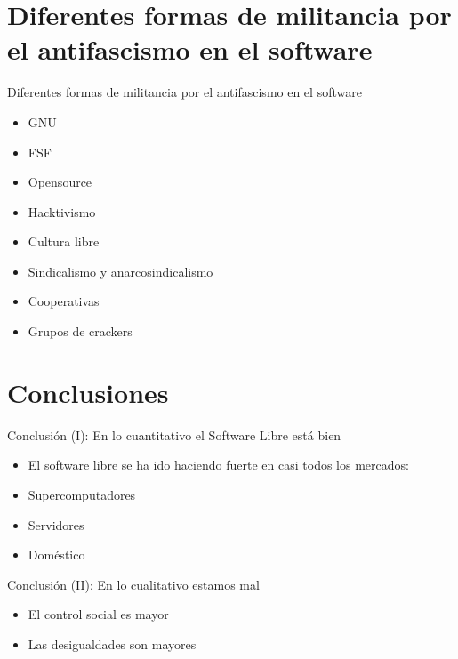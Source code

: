 \documentclass[bigger]{beamer}
\begin{document}
\section{Diferentes formas de militancia por el antifascismo en el software}
\label{sec-6}
\begin{frame}[label=sec-6-1]{Diferentes formas de militancia por el antifascismo en el software}
\begin{itemize}
\item GNU
\item FSF
\item Opensource
\item Hacktivismo
\item Cultura libre
\item Sindicalismo y anarcosindicalismo
\item Cooperativas
\item Grupos de crackers
\end{itemize}
\end{frame}



\section{Conclusiones}
\label{sec-7}
\begin{frame}[label=sec-7-1]{Conclusión (I): En lo cuantitativo el Software Libre está bien}
\begin{itemize}
\item El software libre se ha ido haciendo fuerte en casi todos los mercados:
\item Supercomputadores
\item Servidores
\item Doméstico
\end{itemize}
\end{frame}
\begin{frame}[label=sec-7-2]{Conclusión (II): En lo cualitativo estamos mal}
\begin{itemize}
\item El control social es mayor
\item Las desigualdades son mayores
\end{itemize}
\end{frame}
\end{document}
